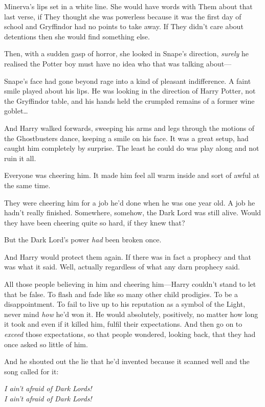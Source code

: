 Minerva's lips set in a white line. She would have words with Them about that
last verse, if They thought she was powerless because it was the first day of
school and Gryffindor had no points to take away. If They didn't care about
detentions then she would find something else.

Then, with a sudden gasp of horror, she looked in Snape's direction,
\emph{surely} he realised the Potter boy must have no idea who that was talking
about---

Snape's face had gone beyond rage into a kind of pleasant indifference. A faint
smile played about his lips. He was looking in the direction of Harry Potter,
not the Gryffindor table, and his hands held the crumpled remains of a former
wine goblet{\ldots}

And Harry walked forwards, sweeping his arms and legs through the motions of
the Ghostbusters dance, keeping a smile on his face. It was a great setup, had
caught him completely by surprise. The least he could do was play along and not
ruin it all.

Everyone was cheering him. It made him feel all warm inside and sort of awful
at the same time.

They were cheering him for a job he'd done when he was one year old. A job he
hadn't really finished. Somewhere, somehow, the Dark Lord was still alive.
Would they have been cheering quite so hard, if they knew that?

But the Dark Lord's power \emph{had} been broken once.

And Harry would protect them again. If there was in fact a prophecy and that
was what it said. Well, actually regardless of what any darn prophecy said.

All those people believing in him and cheering him---Harry couldn't stand to
let that be false. To flash and fade like so many other child prodigies. To be
a disappointment. To fail to live up to his reputation as a symbol of the
Light, never mind \emph{how} he'd won it. He would absolutely, positively,
no matter how long it took and even if it killed him, fulfil their
expectations. And then go on to \emph{exceed} those expectations, so that
people wondered, looking back, that they had once asked so little of him.

And he shouted out the lie that he'd invented because it scanned well and the
song called for it:

\begin{center}
\emph{I ain't afraid of Dark Lords!\\
I ain't afraid of Dark Lords!}
\end{center}

